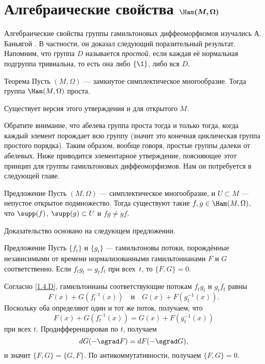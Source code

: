 {\section[\texorpdfstring{Алгебраические свойства $\Ham(M,\Omega)$}{Алгебраические свойства Ham(M,Ω)}]%
{Алгебраические свойства $\bm{\Ham(M, \Omega)}$}

Алгебраические свойства группы гамильтоновых диффеоморфизмов изучались А. Баньягой \cite{B1,B2}.
В частности, он доказал следующий поразительный результат.
Напомним, что группа $D$ называется \emph{простой}, если каждая её нормальная подгруппа тривиальна, то есть она либо $\{\1\}$, либо вся $D$.

\begin{thm}{Теорема}\label{1.5.A}
Пусть $(M, \Omega)$ — замкнутое симплектическое многообразие.
Тогда группа $\Ham (M, \Omega)$ проста.
\end{thm}

Существует версия этого утверждения и для открытого $M$.

Обратите внимание, что абелева группа проста тогда и только тогда, когда каждый элемент порождает всю группу (значит это конечная циклическая группа простого порядка).
Таким образом, вообще говоря, простые группы далеки от абелевых.
Ниже приводится элементарное утверждение, поясняющее этот принцип для группы гамильтоновых диффеоморфизмов.
Нам он потребуется в следующей главе.

\begin{thm}{Предложение}\label{1.5.B}
Пусть $(M, \Omega)$ — симплектическое многообразие, и $U \subset M$ — непустое открытое подмножество.
Тогда существуют такие $f, g \in \Ham (M, \Omega)$, что $\supp (f)$, $\supp (g) \subset U$ и $f g \ne gf$.
\end{thm}

Доказательство основано на следующем предложении.

\begin{thm}{Предложение}\label{1.5.C}
Пусть $\{f_t\}$ и $\{g_t\}$ — гамильтоновы потоки, порождённые независимыми от времени нормализованными гамильтонианами $F$ и $G$ соответственно.
Если $f_t g_t = g_t f_t$ при всех~$t$, то $\{F, G\} = 0$.
\end{thm}

Согласно \ref{1.4.D}, гамильтонианы соответствующие потокам $f_t g_t$ и $g_t f_t$ равны
\[F(x)+G(f_t^{-1} (x))
\quad\text{и}\quad
G (x) + F (g_t^{-1}(x)).
\]
Поскольку оба определяют один и тот же поток, получаем, что 
\[F (x) + G (f_t^{-1} (x)) = G (x) + F (g_t^{-1} (x))\]
при всех $t$.
Продифференцировав по $t$, получаем
\[\d G(-\sgrad F)=\d F(-\sgrad G),\]
и значит $\{F, G\} = \{G, F\}$.
По антикоммутативности, получаем $\{F, G\} = 0$.
\qeds

}
